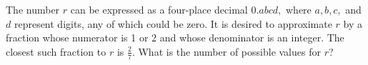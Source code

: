 The number $r$ can be expressed as a four-place decimal $0.abcd,$ where $a, b, c,$ and $d$ represent digits, any of which could be zero.  It is desired to approximate $r$ by a fraction whose numerator is 1 or 2 and whose denominator is an integer. The closest such fraction to $r$ is $\frac 27.$  What is the number of possible values for $r$?
